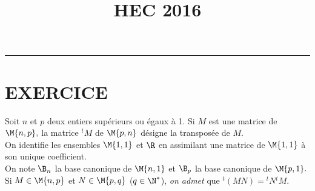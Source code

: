 \documentclass[11pt]{article}%
\title{\bf \vspace{-1.6cm} HEC 2016} %
\author{} %
\date{} %
\begin{document}
\maketitle %
\vspace{-1.2cm}\hrule %
\thispagestyle{fancy}

\vspace*{.4cm}


\section*{EXERCICE} %

\noindent 
Soit $n$ et $p$ deux entiers supérieurs ou égaux à 1.
Si $M$ est une matrice de $\M{n,p},$ la matrice ${}^t{}M$ de 
$\M{p,n}$ désigne la transposée de $M.$\\
On identifie les ensembles $\M{1,1}$ et $\R$ en assimilant 
une matrice de $\M{1,1}$ à son unique coefficient.\\
On note $\B_n$ la base canonique de $\M{n,1}$ et 
$\B_p$ la base canonique de $\M{p,1}.$\\
Si $M \in \M{n,p}$ et $N \in \M{p,q}$ ($q 
\in \N^*$), {\it on admet} que 
${}^t{}{(MN)}={}^{t}{}{N}{}^{t}{}{M}$.
\end{document}
